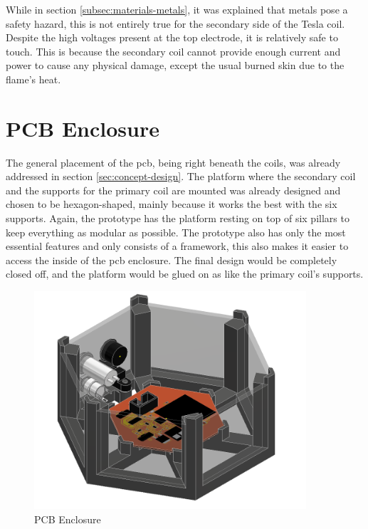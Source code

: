While in section \ref{subsec:materials-metals}, it was explained that metals pose a safety hazard, this is not entirely true for the secondary side of the Tesla coil. Despite the high voltages present at the top electrode, it is relatively safe to touch. This is because the secondary coil cannot provide enough current and power to cause any physical damage, except the usual burned skin due to the flame's heat.

\section{PCB Enclosure}

The general placement of the \gls{pcb}, being right beneath the coils, was already addressed in section \ref{sec:concept-design}. The platform where the secondary coil and the supports for the primary coil are mounted was already designed and chosen to be hexagon-shaped, mainly because it works the best with the six supports. Again, the prototype has the platform resting on top of six pillars to keep everything as modular as possible. The prototype also has only the most essential features and only consists of a framework, this also makes it easier to access the inside of the \gls{pcb} enclosure. The final design would be completely closed off, and the platform would be glued on as like the primary coil’s supports.

\begin{figure}[h!]
    \centering
    \includegraphics[width=0.9\textwidth]{kassandra/resources/JerJerWoBistDu.PNG}
    \caption{PCB Enclosure}
    \label{fig:bottom-bau}
\end{figure}

